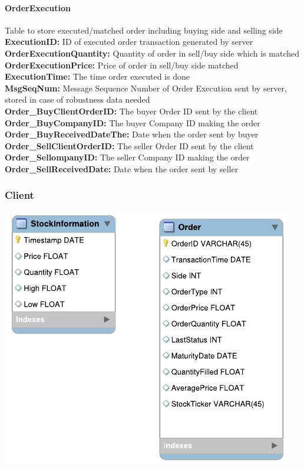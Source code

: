 \documentclass[a4paper, 11pt]{article}
\begin{document}
\paragraph*{OrderExecution}
Table to store executed/matched order including buying side and selling side
 \\
\textbf{ExecutionID:} ID of executed order transaction generated by server
 \\
\textbf{OrderExecutionQuantity:} Quantity of order in sell/buy side which is matched
 \\
\textbf{OrderExecutionPrice:} Price of order in sell/buy side matched
 \\
\textbf{ExecutionTime:} The time order executed is done
 \\
\textbf{MsgSeqNum:} Message Sequence Number of Order Execution sent by server, stored in case of robustness data needed	
 \\
\textbf{Order\_BuyClientOrderID:} The buyer Order ID sent by the client 
 \\
\textbf{Order\_BuyCompanyID:} The buyer Company ID making the order	
 \\
\textbf{Order\_BuyReceivedDateThe:} Date when the order sent by buyer 
 \\
\textbf{Order\_SellClientOrderID:} The seller Order ID sent by the client
 \\
\textbf{Order\_SellompanyID:} The seller Company ID making the order
 \\
\textbf{Order\_SellReceivedDate:} Date when the order sent by seller 
 

\subsubsection*{Client}
\begin{center}\includegraphics{../diagrams/client_database.pdf}\end{center}
\end{document}
